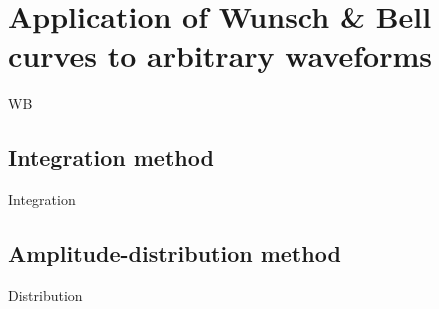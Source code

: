 \section{Application of Wunsch & Bell curves to arbitrary waveforms}
\label{sec:wb-for-arbitrary-wvfs}

WB


\subsection{Integration method}

Integration

\subsection{Amplitude-distribution method}

Distribution
